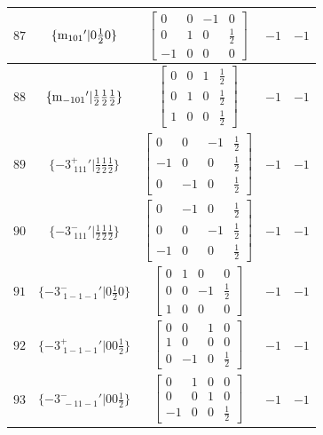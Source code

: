 \documentclass[fleqn,8pt]{jsarticle}
\begin{document}
\begin{longtable}{ccccc}
$ 87 $ & $ \{{\rm m}_{101}{}'|0 \frac{1}{2} 0\} $ & $ \begin{bmatrix} 0 & 0 & -1 & 0 \\ 0 & 1 & 0 & \frac{1}{2} \\ -1 & 0 & 0 & 0 \end{bmatrix} $ & $ -1 $ & $ -1 $ \\ \hline
$ 88 $ & $ \{{\rm m}_{-101}{}'|\frac{1}{2} \frac{1}{2} \frac{1}{2}\} $ & $ \begin{bmatrix} 0 & 0 & 1 & \frac{1}{2} \\ 0 & 1 & 0 & \frac{1}{2} \\ 1 & 0 & 0 & \frac{1}{2} \end{bmatrix} $ & $ -1 $ & $ -1 $ \\ \hline
$ 89 $ & $ \{-3^{+}_{\,\,111}{}'|\frac{1}{2} \frac{1}{2} \frac{1}{2}\} $ & $ \begin{bmatrix} 0 & 0 & -1 & \frac{1}{2} \\ -1 & 0 & 0 & \frac{1}{2} \\ 0 & -1 & 0 & \frac{1}{2} \end{bmatrix} $ & $ -1 $ & $ -1 $ \\ \hline
$ 90 $ & $ \{-3^{-}_{\,\,111}{}'|\frac{1}{2} \frac{1}{2} \frac{1}{2}\} $ & $ \begin{bmatrix} 0 & -1 & 0 & \frac{1}{2} \\ 0 & 0 & -1 & \frac{1}{2} \\ -1 & 0 & 0 & \frac{1}{2} \end{bmatrix} $ & $ -1 $ & $ -1 $ \\ \hline
$ 91 $ & $ \{-3^{-}_{\,\,1-1-1}{}'|0 \frac{1}{2} 0\} $ & $ \begin{bmatrix} 0 & 1 & 0 & 0 \\ 0 & 0 & -1 & \frac{1}{2} \\ 1 & 0 & 0 & 0 \end{bmatrix} $ & $ -1 $ & $ -1 $ \\ \hline
$ 92 $ & $ \{-3^{+}_{\,\,1-1-1}{}'|0 0 \frac{1}{2}\} $ & $ \begin{bmatrix} 0 & 0 & 1 & 0 \\ 1 & 0 & 0 & 0 \\ 0 & -1 & 0 & \frac{1}{2} \end{bmatrix} $ & $ -1 $ & $ -1 $ \\ \hline
$ 93 $ & $ \{-3^{-}_{\,\,-11-1}{}'|0 0 \frac{1}{2}\} $ & $ \begin{bmatrix} 0 & 1 & 0 & 0 \\ 0 & 0 & 1 & 0 \\ -1 & 0 & 0 & \frac{1}{2} \end{bmatrix} $ & $ -1 $ & $ -1 $ \\ \hline

\end{longtable}
\end{document}
